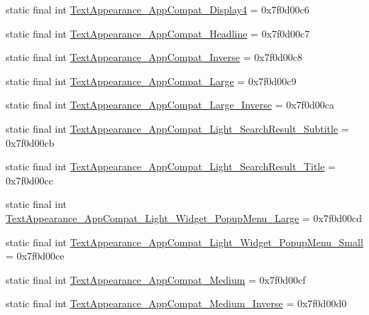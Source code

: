 \begin{DoxyCompactItemize}
\item 
static final int \mbox{\hyperlink{classcom_1_1synnapps_1_1carouselview_1_1_r_1_1style_a33c505cc9f08ccc2ffa2b8b787b4bc33}{Text\+Appearance\+\_\+\+App\+Compat\+\_\+\+Display4}} = 0x7f0d00c6
\item 
static final int \mbox{\hyperlink{classcom_1_1synnapps_1_1carouselview_1_1_r_1_1style_ae347e40b3517a0295c583b2a9977c6d8}{Text\+Appearance\+\_\+\+App\+Compat\+\_\+\+Headline}} = 0x7f0d00c7
\item 
static final int \mbox{\hyperlink{classcom_1_1synnapps_1_1carouselview_1_1_r_1_1style_a9521902983a3b8c6d6c6f94c504ce932}{Text\+Appearance\+\_\+\+App\+Compat\+\_\+\+Inverse}} = 0x7f0d00c8
\item 
static final int \mbox{\hyperlink{classcom_1_1synnapps_1_1carouselview_1_1_r_1_1style_a3c6bf3c331705de47b54c114f5fa32da}{Text\+Appearance\+\_\+\+App\+Compat\+\_\+\+Large}} = 0x7f0d00c9
\item 
static final int \mbox{\hyperlink{classcom_1_1synnapps_1_1carouselview_1_1_r_1_1style_a80d8a0211ba04dea7320b7bb9b6588f6}{Text\+Appearance\+\_\+\+App\+Compat\+\_\+\+Large\+\_\+\+Inverse}} = 0x7f0d00ca
\item 
static final int \mbox{\hyperlink{classcom_1_1synnapps_1_1carouselview_1_1_r_1_1style_a7115fe83ed48519353f0eac1c3cb25f9}{Text\+Appearance\+\_\+\+App\+Compat\+\_\+\+Light\+\_\+\+Search\+Result\+\_\+\+Subtitle}} = 0x7f0d00cb
\item 
static final int \mbox{\hyperlink{classcom_1_1synnapps_1_1carouselview_1_1_r_1_1style_a1c3afdff1d2b89747b11817fdf9af090}{Text\+Appearance\+\_\+\+App\+Compat\+\_\+\+Light\+\_\+\+Search\+Result\+\_\+\+Title}} = 0x7f0d00cc
\item 
static final int \mbox{\hyperlink{classcom_1_1synnapps_1_1carouselview_1_1_r_1_1style_af85586b97f174930fb2da4a73c32c95b}{Text\+Appearance\+\_\+\+App\+Compat\+\_\+\+Light\+\_\+\+Widget\+\_\+\+Popup\+Menu\+\_\+\+Large}} = 0x7f0d00cd
\item 
static final int \mbox{\hyperlink{classcom_1_1synnapps_1_1carouselview_1_1_r_1_1style_aa7a26a18abae7f57edc395ef12e4e4ed}{Text\+Appearance\+\_\+\+App\+Compat\+\_\+\+Light\+\_\+\+Widget\+\_\+\+Popup\+Menu\+\_\+\+Small}} = 0x7f0d00ce
\item 
static final int \mbox{\hyperlink{classcom_1_1synnapps_1_1carouselview_1_1_r_1_1style_a7cb1546a6e87f154abeea3d83648b1a4}{Text\+Appearance\+\_\+\+App\+Compat\+\_\+\+Medium}} = 0x7f0d00cf
\item 
static final int \mbox{\hyperlink{classcom_1_1synnapps_1_1carouselview_1_1_r_1_1style_a229941dac623c58aa3830339710d991a}{Text\+Appearance\+\_\+\+App\+Compat\+\_\+\+Medium\+\_\+\+Inverse}} = 0x7f0d00d0

\end{DoxyCompactItemize}
